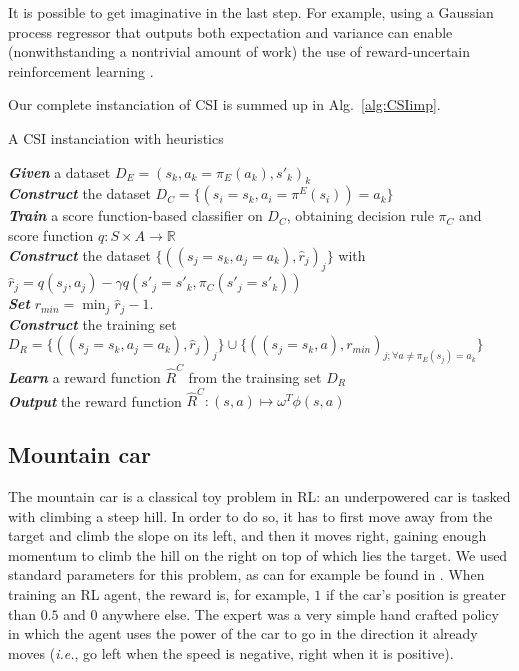 \documentclass[smallextended]{svjour3}
\begin{document}
It is possible to get imaginative in the last step. For example, using a Gaussian process regressor \cite{rasmussen2006gaussian} that outputs both expectation and variance can enable (nonwithstanding a nontrivial amount of work) the use of reward-uncertain reinforcement learning \cite{regan2011robust}. 

Our complete instanciation of CSI is summed up in Alg.~\ref{alg:CSIimp}.
\begin{algorithm}%
  \caption{A CSI instanciation with heuristics}
  \label{alg:CSIimp}
  \emph{\textbf{Given}} a dataset  $D_E = (s_k,a_k=\pi_E(a_k),s'_k)_k$\;\\
  \emph{\textbf{Construct}} the dataset $D_C=\{(s_i=s_k,a_i=\pi^E(s_i))=a_k\}$ \;\\
  \emph{\textbf{Train}} a score function-based classifier on $D_C$, obtaining decision rule $\pi_C$ and score function $q:S\times A \rightarrow \mathbb R$ \;\\
\emph{\textbf{Construct}} the dataset $\{((s_{j}=s_k,a_{j}=a_k),\hat r_j)_j\}$ with $\hat r_j = q(s_j,a_j) - \gamma q(s'_j=s'_k,\pi_C(s'_j=s'_k))$\;\\
\emph{\textbf{Set}} $r_{min} = \min_j\hat r_j - 1.$\;\\
\emph{\textbf{Construct}} the training set  $D_R = \{((s_{j}=s_k,a_{j}=a_k),\hat r_j)_j\}\cup\{((s_j=s_k,a),r_{min})_{j;\forall a\neq \pi_E(s_j) = a_k}\}$ \;\\
\emph{\textbf{Learn}} a reward function $\hat R^C$ from the trainsing set $D_R$\;\\
\emph{\textbf{Output}} the reward function $\hat R^{C}: (s,a) \mapsto \omega^T \phi(s,a)$ \;
\end{algorithm}
\subsection{Mountain car}
\label{subsec:mountaincar}
The mountain car is a classical toy problem in RL: an underpowered car is tasked with climbing a steep hill. In order to do so, it has to first move away from the target and climb the slope on its left, and then it moves right, gaining enough momentum to climb the hill on the right on top of which lies the target. We used standard parameters for this problem, as can for example be found in \cite{sutton1998reinforcement}. When training an RL agent, the reward is, for example, $1$ if the car's position is greater than $0.5$ and $0$ anywhere else. The expert was a very simple hand crafted policy in which the agent uses the power of the car to go in the direction it already moves ({\it i.e.}, go left when the speed is negative, right when it is positive).\\
\end{document}
